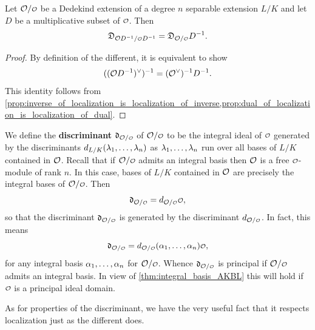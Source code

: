     \begin{proposition}\label{prop:different_respect_localization}
      Let \(\mc{O}/\smc{O}\) be a Dedekind extension of a degree \(n\) separable extension \(L/K\) and let \(D\) be a multiplicative subset of \(\smc{O}\). Then
      \[
        \mf{D}_{\mc{O}D^{-1}/\smc{O}D^{-1}} = \mf{D}_{\mc{O}/\smc{O}}D^{-1}.
      \]
    \end{proposition}
    \begin{proof}
      By definition of the different, it is equivalent to show
      \[
        ((\mathcal{O}D^{-1})^{\vee})^{-1} = (\mathcal{O}^{\vee})^{-1}D^{-1}.
      \]
      This identity follows from \cref{prop:inverse_of_localization_is_localization_of_inverse,prop:dual_of_localization_is_localization_of_dual}. 
    \end{proof}

    We define the \textbf{discriminant} \(\mf{d}_{\mc{O}/\smc{O}}\) of \(\mc{O}/\smc{O}\) to be the integral ideal of \(\smc{O}\) generated by the discriminants \(d_{L/K}(\lambda_{1},\ldots,\lambda_{n})\) as \(\lambda_{1},\ldots,\lambda_{n}\) run over all bases of \(L/K\) contained in \(\mathcal{O}\). Recall that if \(\mc{O}/\smc{O}\) admits an integral basis then \(\mathcal{O}\) is a free \(\smc{O}\)-module of rank \(n\). In this case, bases of \(L/K\) contained in \(\mathcal{O}\) are precisely the integral bases of \(\mc{O}/\smc{O}\). Then
    \[
      \mf{d}_{\mc{O}/\smc{O}} = d_{\mc{O}/\smc{O}}\smc{O},
    \]
    so that the discriminant \(\mf{d}_{\mc{O}/\smc{O}}\) is generated by the discriminant \(d_{\mc{O}/\smc{O}}\). In fact, this means
    \[
      \mf{d}_{\mc{O}/\smc{O}} = d_{\mc{O}/\smc{O}}(\a_{1},\ldots,\a_{n})\smc{O},
    \]
    for any integral basis \(\alpha_{1},\ldots,\alpha_{n}\) for \(\mc{O}/\smc{O}\). Whence \(\mf{d}_{\mc{O}/\smc{O}}\) is principal if \(\mc{O}/\smc{O}\) admits an integral basis. In view of \cref{thm:integral_basis_AKBL} this will hold if \(\smc{O}\) is a principal ideal domain.

    As for properties of the discriminant, we have the very useful fact that it respects localization just as the different does.

